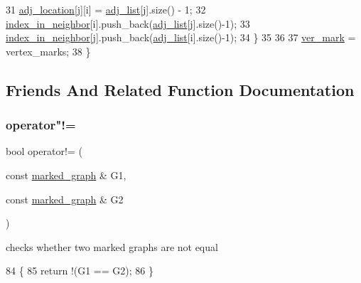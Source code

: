\begin{DoxyCode}
31     \hyperlink{classmarked__graph_a3ae722ea9583ad23af34d789a88ac01a}{adj\_location}[j][i] = \hyperlink{classmarked__graph_a1a0bf7ca413a278763f7c878b3b6fd6f}{adj\_list}[j].size() - 1;
32     \hyperlink{classmarked__graph_aee10b537408de42476609c1e45c075d0}{index\_in\_neighbor}[i].push\_back(\hyperlink{classmarked__graph_a1a0bf7ca413a278763f7c878b3b6fd6f}{adj\_list}[j].size()-1);
33     \hyperlink{classmarked__graph_aee10b537408de42476609c1e45c075d0}{index\_in\_neighbor}[j].push\_back(\hyperlink{classmarked__graph_a1a0bf7ca413a278763f7c878b3b6fd6f}{adj\_list}[i].size()-1);
34   \}
35 
36 
37   \hyperlink{classmarked__graph_ac83e9377dd4d8bb95be1ac949b127296}{ver\_mark} = vertex\_marks;
38 \}
\end{DoxyCode}


\subsection{Friends And Related Function Documentation}
\mbox{\label{classmarked__graph_a52ab641f19231908b18f8661bad17493}} 
\subsubsection{\texorpdfstring{operator"!=}{operator!=}}
{\footnotesize\ttfamily bool operator!= (\begin{DoxyParamCaption}\item[{const \hyperlink{classmarked__graph}{marked\+\_\+graph} \&}]{G1,  }\item[{const \hyperlink{classmarked__graph}{marked\+\_\+graph} \&}]{G2 }\end{DoxyParamCaption})\hspace{0.3cm}{\ttfamily [friend]}}



checks whether two marked graphs are not equal 


\begin{DoxyCode}
84 \{
85   \textcolor{keywordflow}{return} !(G1 == G2);
86 \}
\end{DoxyCode}
\mbox{\label{classmarked__graph_a4f98d2df29f50f6da1365a14fd80d764}} 
